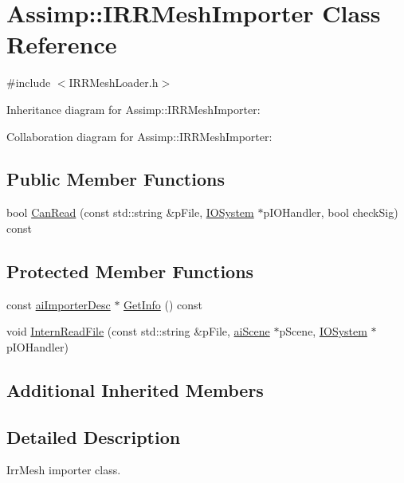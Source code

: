 \hypertarget{class_assimp_1_1_i_r_r_mesh_importer}{\section{Assimp\+:\+:I\+R\+R\+Mesh\+Importer Class Reference}
\label{class_assimp_1_1_i_r_r_mesh_importer}
}


{\ttfamily \#include $<$I\+R\+R\+Mesh\+Loader.\+h$>$}



Inheritance diagram for Assimp\+:\+:I\+R\+R\+Mesh\+Importer\+:


Collaboration diagram for Assimp\+:\+:I\+R\+R\+Mesh\+Importer\+:
\subsection*{Public Member Functions}
\begin{DoxyCompactItemize}
\item 
bool \hyperlink{class_assimp_1_1_i_r_r_mesh_importer_a8fdf1a7a45bb589fc65c47f5f4803328}{Can\+Read} (const std\+::string \&p\+File, \hyperlink{class_assimp_1_1_i_o_system}{I\+O\+System} $\ast$p\+I\+O\+Handler, bool check\+Sig) const 
\end{DoxyCompactItemize}
\subsection*{Protected Member Functions}
\begin{DoxyCompactItemize}
\item 
const \hyperlink{structai_importer_desc}{ai\+Importer\+Desc} $\ast$ \hyperlink{class_assimp_1_1_i_r_r_mesh_importer_a9d3e014c7102567fc7c9d17c6da4aa31}{Get\+Info} () const 
\item 
void \hyperlink{class_assimp_1_1_i_r_r_mesh_importer_ab15c2a44e777baf330e51535b4f2a2e0}{Intern\+Read\+File} (const std\+::string \&p\+File, \hyperlink{structai_scene}{ai\+Scene} $\ast$p\+Scene, \hyperlink{class_assimp_1_1_i_o_system}{I\+O\+System} $\ast$p\+I\+O\+Handler)
\end{DoxyCompactItemize}
\subsection*{Additional Inherited Members}


\subsection{Detailed Description}
Irr\+Mesh importer class.

